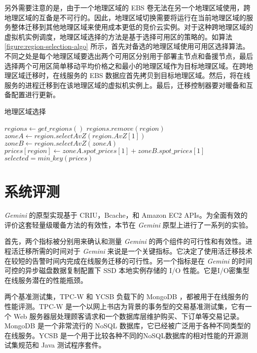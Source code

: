 另外需要注意的是，由于一个地理区域的 EBS 卷无法在另一个地理区域使用，跨地理区域的互备是不可行的。因此，地理区域切换需要将运行在当前地理区域的服务整体迁移到其他地理区域来使用成本更低的竞价云实例。对于这种跨地理区域的虚拟机实例调度，地理区域选择的方法是基于选择可用区的策略的。如算法 \ref{figure:region-selection-algo} 所示，首先对备选的地理区域使用可用区选择算法。不同之处是每个地理区域要选出两个可用区分别用于部署主节点和备援节点，最后选择两个可用区简单移动平均价格之和最小的地理区域作为目标地理区域。在跨地理区域迁移时，在线服务的 EBS 数据应首先拷贝到目标地理区域。然后，将在线服务的进程迁移到在该地理区域的虚拟机实例上。最后，迁移控制器要对暖备和互备配置进行更新。

\begin{algorithm}
\caption{地理区域选择}
\label{figure:region-selection-algo}

$regions\gets get\_regions()$
{
  {
    $regions.remove(region)$\;
  }
}
{
  $zoneA\gets region.selectAvZ(region.AvZ[1])$\;
  $zoneB\gets region.selectAvZ(zoneA)$\;
  $prices[region]\gets zoneA.spot\_prices[1] + zoneB.spot\_prices[1]$\;
}
$selected = min\_key(prices)$\;
\;
\end{algorithm}

\section{系统评测}
\emph{Gemini} 的原型实现基于 CRIU，Bcache，和 Amazon EC2 APIs。为全面有效的评价这套轻量级暖备方法的有效性，本节在 \emph{Gemini} 原型上进行了一系列的实验。

首先，两个指标被分别用来确认和测量 \emph{Gemini} 的两个组件的可行性和有效性。进程活迁移所需的时间对于 \emph{Gemini} 来说是一个关键指标。它决定了使用活迁移技术在较短的告警时间内完成在线服务迁移的可行性。另一个指标是在 \emph{Gemini} 的时间可控的异步磁盘数据复制配置下 SSD 本地实例存储的 I/O 性能。它是I/O密集型在线服务潜在的性能瓶颈。

两个基准测试集，TPC-W \cite{TPCW:2014} 和 YCSB \cite{YCSB:2014} 负载下的 MongoDB \cite{Mongodb:2014}，都被用于在线服务的性能评测。TPC-W 是一个以网上书店为背景的事务型的交易基准测试集，它有一个 Web 服务器层处理顾客请求和一个数据库层维护购买、下订单等交易记录。MongoDB 是一个非常流行的 NoSQL 数据库，它已经被广泛用于各种不同类型的在线服务。YCSB 是一个用于比较各种不同的NoSQL数据库的相对性能的开源测试集规范和 Java 测试程序套件。

